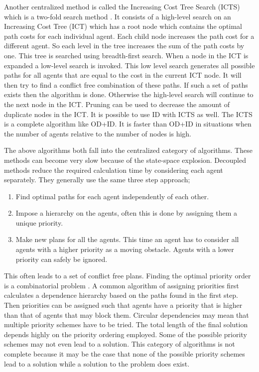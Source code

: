 Another centralized method is called the Increasing Cost Tree Search (ICTS)
which is a
two-fold search method \cite{sharon2013}. It consists of a high-level search on
an Increasing Cost Tree (ICT) which has a root node which contains the optimal
path costs for each individual agent. Each child node increases the path cost
for a different agent. So each level in the tree increases the sum of the path
costs by one. This tree is searched using breadth-first search. When a node in
the ICT is expanded a low-level search is invoked. This low level search
generates all possible paths for all agents that are equal to the cost in the
current
ICT node. It will then try to find a conflict free combination of these paths.
If such a set of paths exists then the algorithm is done. Otherwise the
high-level search will continue to the next node in the ICT. Pruning can be
used to decrease the amount of duplicate nodes in the ICT. It is possible
to use ID with ICTS as well. The ICTS is a complete algorithm like OD+ID. It is
faster than OD+ID in situations when the number of agents relative to the
number of nodes is high.


The above algorithms both fall into the centralized category of algorithms.
These methods can become very slow because of the state-space explosion.
Decoupled methods reduce the required calculation time by considering each
agent separately. They generally use the same three step approach;
\begin{enumerate}
    \item Find optimal paths for each agent independently of each other.
    \item Impose a hierarchy on the agents, often this is done by assigning
    them a unique priority.
    \item Make new plans for all the agents. This time an agent has to consider
    all agents with a higher priority as a moving obstacle. Agents with a lower
    priority can safely be ignored.
\end{enumerate}
This often leads to a set of conflict free plans. Finding the optimal priority
order is a combinatorial problem \cite{bennewitz2002}. A common algorithm of
assigning priorities first calculates a dependence hierarchy based on the paths
found in the first step. Then priorities can be assigned such that agents have
a priority that is higher than that of agents that may block them. Circular
dependencies may mean that multiple priority schemes have to be tried. The
total length of the final solution depends highly on the priority ordering
employed.
Some of the possible priority schemes may not even lead to a solution. This
category of algorithms is not complete because it may be the case that none of
the possible priority schemes lead to a solution while a solution to the
problem does exist.

